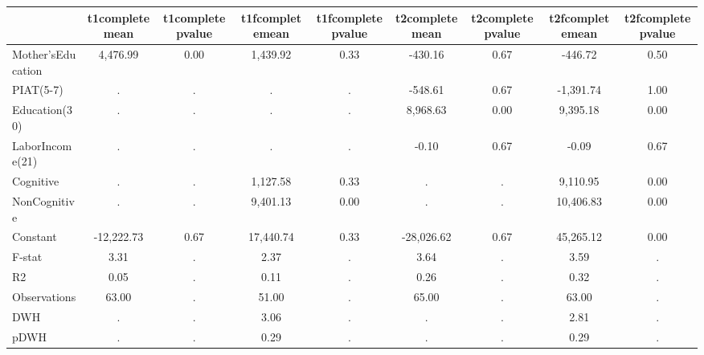 \begin{table}[htbp]
\begin{tabular}{lcccccccc} \hline \hline
 & t1completemean  & t1completepvalue  & t1fcompletemean  & t1fcompletepvalue  & t2completemean  & t2completepvalue  & t2fcompletemean  & t2fcompletepvalue  \\  \hline 
Mother'sEducation &     4,476.99 &         0.00 &     1,439.92 &         0.33 &      -430.16 &         0.67 &      -446.72 &         0.50 \\  
PIAT(5-7) &            . &            . &            . &            . &      -548.61 &         0.67 &    -1,391.74 &         1.00 \\  
Education(30) &            . &            . &            . &            . &     8,968.63 &         0.00 &     9,395.18 &         0.00 \\  
LaborIncome(21) &            . &            . &            . &            . &        -0.10 &         0.67 &        -0.09 &         0.67 \\  
Cognitive &            . &            . &     1,127.58 &         0.33 &            . &            . &     9,110.95 &         0.00 \\  
NonCognitive &            . &            . &     9,401.13 &         0.00 &            . &            . &    10,406.83 &         0.00 \\  
Constant &   -12,222.73 &         0.67 &    17,440.74 &         0.33 &   -28,026.62 &         0.67 &    45,265.12 &         0.00 \\  
F-stat &         3.31 &            . &         2.37 &            . &         3.64 &            . &         3.59 &            . \\  
R2 &         0.05 &            . &         0.11 &            . &         0.26 &            . &         0.32 &            . \\  
Observations &        63.00 &            . &        51.00 &            . &        65.00 &            . &        63.00 &            . \\  
DWH &            . &            . &         3.06 &            . &            . &            . &         2.81 &            . \\  
pDWH &            . &            . &         0.29 &            . &            . &            . &         0.29 &            . \\  
\hline \hline \end{tabular}
\end{table}
